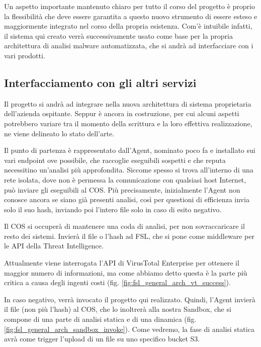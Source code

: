 Un aspetto importante mantenuto chiaro per tutto il corso del progetto è proprio la flessibilità che deve essere garantita a questo nuovo strumento di essere esteso e maggiormente integrato nel corso della propria esistenza. Com'è intuibile infatti, il sistema qui creato verrà successivamente usato come base per la propria architettura di analisi malware automatizzata, che si andrà ad interfacciare con i vari prodotti.

\subsection{Interfacciamento con gli altri servizi}
\label{chap:intro_interface_with_other_services}

Il progetto si andrà ad integrare nella nuova architettura di sistema proprietaria dell'azienda ospitante.
Seppur è ancora in costruzione, per cui alcuni aspetti potrebbero variare tra il momento della scrittura e la loro effettiva realizzazione, ne viene delineato lo stato dell'arte.

Il punto di partenza è rappresentato dall'Agent, nominato poco fa e installato sui vari endpoint ove possibile, che raccoglie eseguibili sospetti e che reputa necessitino un'analisi più approfondita.
Siccome spesso si trova all'interno di una rete isolata, dove non è permessa la comunicazione con qualsiasi host Internet, può inviare gli eseguibili al COS. Più precisamente, inizialmente l'Agent non conosce ancora se siano già presenti analisi, così per questioni di efficienza invia solo il suo hash, inviando poi l'intero file solo in caso di esito negativo.

Il COS si occuperà di mantenere una coda di analisi, per non sovraccaricare il resto dei sistemi.
Invierà il file o l'hash ad FSL, che si pone come middleware per le API della Threat Intelligence.

Attualmente viene interrogata l'API di VirusTotal Enterprise per ottenere il maggior numero di informazioni, ma come abbiamo detto questa è la parte più critica a causa degli ingenti costi (fig. \ref{fig:fsl_general_arch_vt_success}).

In caso negativo, verrà invocato il progetto qui realizzato. Quindi, l'Agent invierà il file (non più l'hash) al COS, che lo inoltrerà alla nostra Sandbox, che si compone di una parte di analisi statica e di una dinamica (fig. \ref{fig:fsl_general_arch_sandbox_invoke}). Come vedremo, la fase di analisi statica avrà come trigger l'upload di un file su uno specifico bucket S3.

